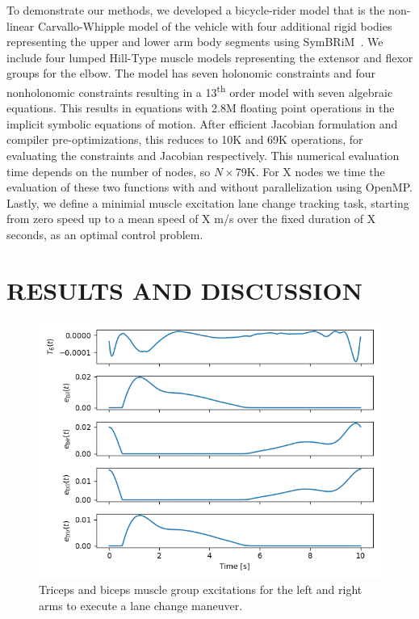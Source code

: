 \documentclass[11pt,twocolumn]{article}
\begin{document}
To demonstrate our methods, we developed a bicycle-rider model that is the
non-linear Carvallo-Whipple model of the vehicle with four additional rigid
bodies representing the upper and lower arm body segments using
SymBRiM~\cite{Stienstra2023a}. We include four lumped Hill-Type muscle models
representing the extensor and flexor groups for the elbow. The model has seven
holonomic constraints and four nonholonomic constraints resulting in a
13\textsuperscript{th} order model with seven algebraic equations. This results
in equations with 2.8M floating point operations in the implicit symbolic
equations of motion. After efficient Jacobian formulation and compiler
pre-optimizations, this reduces to 10K and 69K operations, for evaluating the
constraints and Jacobian respectively. This numerical evaluation time depends on
the number of nodes, so \(N\times\)79K. For X nodes we time the evaluation of
these two functions with and without parallelization using OpenMP. Lastly, we
define a minimial muscle excitation lane change tracking task, starting from
zero speed up to a mean speed of X m/s over the fixed duration of X seconds, as
an optimal control problem.

\section*{RESULTS AND DISCUSSION}
%
\begin{figure}
    \centering
    \includegraphics[width=\linewidth]{figures/arm-muscle-bicycle-excitation.png}
    \caption{Triceps and biceps muscle group excitations for the left and right arms to execute a lane change maneuver.}
    \label{fig:trajectories}
\end{figure}
\end{document}
